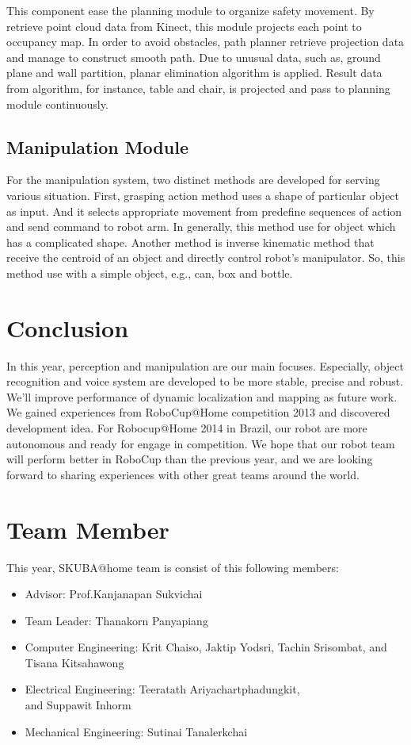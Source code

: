 \documentclass{llncs}
\begin{document}
This component ease the planning module to organize safety movement. By retrieve point cloud data from Kinect, this module projects each point to occupancy map. In order to avoid obstacles, path planner retrieve projection data and manage to construct smooth path. Due to unusual data, such as, ground plane and wall partition, planar elimination algorithm is applied. Result data from algorithm, for instance, table and chair, is projected and pass to planning module continuously\cite{avoid}.

\subsection{Manipulation Module}

For the manipulation system, two distinct methods are developed for serving various situation. First, grasping action method uses a shape of particular object as input. And it selects appropriate movement from predefine sequences of action and send command to robot arm. In generally, this method use for object which has a complicated shape. Another method is inverse kinematic method that receive the centroid of an object and directly control robot's manipulator. So, this method use with a simple object, e.g., can, box and bottle.

\section{Conclusion}

In this year, perception and manipulation are our main focuses. Especially, object recognition and voice system are developed to be more stable, precise and robust. We'll improve performance of dynamic localization and mapping as future work. We gained experiences from RoboCup@Home competition 2013 and discovered development idea. For Robocup@Home 2014 in Brazil, our robot are more autonomous and ready for engage in competition. We hope that our robot team will perform better in RoboCup than the previous year, and we are looking forward to sharing experiences with other great teams around the world.

\section*{Team Member}

This year, SKUBA@home team is consist of this following members:
\begin{itemize}
\item Advisor: Prof.Kanjanapan Sukvichai
\item Team Leader: Thanakorn Panyapiang
\item Computer Engineering: Krit Chaiso, Jaktip Yodsri, Tachin Srisombat, and Tisana Kitsahawong
\item Electrical Engineering: Teeratath Ariyachartphadungkit,\\ and Suppawit Inhorm
\item Mechanical Engineering: Sutinai Tanalerkchai
\end{itemize}
\end{document}
